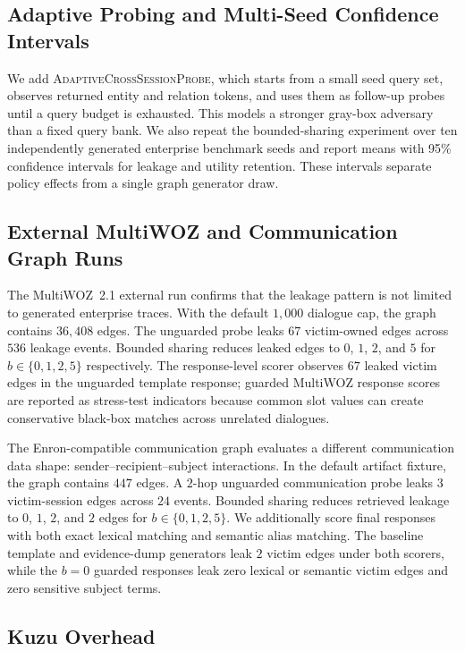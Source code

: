 \documentclass[journal,10pt,twocolumn]{IEEEtran}
\begin{document}
\subsection{Adaptive Probing and Multi-Seed Confidence Intervals}
We add \textsc{AdaptiveCrossSessionProbe}, which starts from a small
seed query set, observes returned entity and relation tokens, and uses
them as follow-up probes until a query budget is exhausted. This
models a stronger gray-box adversary than a fixed query bank. We also
repeat the bounded-sharing experiment over ten independently generated
enterprise benchmark seeds and report means with 95\% confidence
intervals for leakage and utility retention. These intervals separate
policy effects from a single graph generator draw.

\subsection{External MultiWOZ and Communication Graph Runs}
The MultiWOZ~2.1 external run confirms that the leakage pattern is not
limited to generated enterprise traces. With the default $1,000$
dialogue cap, the graph contains $36,408$ edges. The unguarded probe
leaks $67$ victim-owned edges across $536$ leakage events. Bounded sharing
reduces leaked edges to $0$, $1$, $2$, and $5$ for
$b\in\{0,1,2,5\}$ respectively. The response-level scorer observes
$67$ leaked victim edges in the unguarded template response; guarded
MultiWOZ response scores are reported as stress-test indicators
because common slot values can create conservative black-box matches
across unrelated dialogues.

The Enron-compatible communication graph evaluates a different
communication data shape: sender--recipient--subject interactions. In the default
artifact fixture, the graph contains $447$ edges. A $2$-hop unguarded
communication probe leaks $3$ victim-session edges across $24$
events. Bounded sharing reduces retrieved leakage to $0$, $1$, $2$,
and $2$ edges for $b\in\{0,1,2,5\}$. We additionally score final
responses with both exact lexical matching and semantic alias
matching. The baseline template and evidence-dump generators leak
$2$ victim edges under both scorers, while the $b{=}0$ guarded
responses leak zero lexical or semantic victim edges and zero
sensitive subject terms.

\subsection{Kuzu Overhead}
\end{document}
